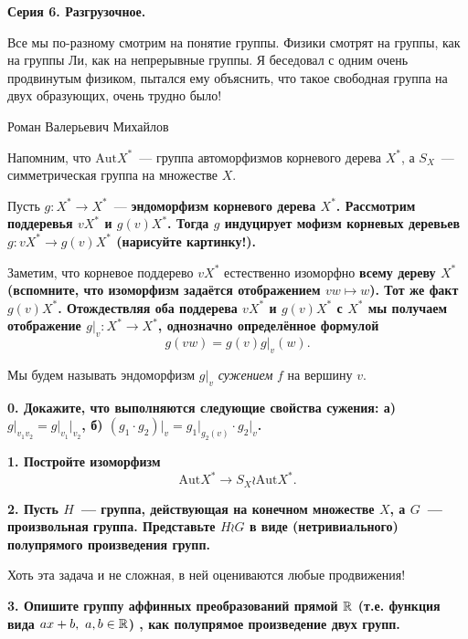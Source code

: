 \documentclass[11pt]{extarticle}
\begin{document}
	\begin{landscape}

	\pagestyle{empty}
	\begin{multicols}{2}

	\centerline{\bf{Серия 6. Разгрузочное. }}


	\epigraph{Все мы по-разному смотрим на понятие группы. Физики смотрят на группы, как на группы Ли, как на непрерывные группы. Я беседовал с одним очень продвинутым физиком, пытался ему объяснить, что такое свободная группа на двух образующих, очень трудно было!}{Роман Валерьевич Михайлов}

	Напомним, что $\mathrm{Aut}{X^*}$~--- группа автоморфизмов корневого дерева $X^*$, а $S_{X}$~---  симметрическая группа на множестве $X$.

	Пусть $g\colon X^* \to X^*$~--- \bf{эндоморфизм} корневого дерева $X^*$. Рассмотрим поддеревья $v X^*$ и $g(v) X^*$. Тогда $g$ индуцирует мофизм корневых деревьев $g\colon v X^* \to g(v) X^*$ (\bf{нарисуйте картинку!}). 

	Заметим, что корневое поддерево $v X^*$ естественно изоморфно \bf{всему} дереву $X^*$ (вспомните, что изоморфизм задаётся отображением $vw \mapsto w$). Тот же факт $g(v)X^*$. Отождествляя оба поддерева $v X^*$ и $g(v) X^*$ с $X^*$ мы получаем отображение $g\vert_{v} \colon X^* \to X^*$, однозначно определённое формулой 
	\[
		g(vw) = g(v) g\vert_{v}(w).
	\]

	Мы будем называть эндоморфизм $g\vert_{v}$ \emph{сужением} $f$ на вершину $v$.

	\bf{0.} Докажите, что выполняются следующие свойства сужения: а) $g\vert_{v_1 v_2} = g\vert_{v_1}\vert_{v_2}$, б) $(g_1 \cdot g_2)\vert_{v} = g_1\vert_{g_2(v)} \cdot g_2\vert_{v}$. 

	\bf{1.} Постройте изоморфизм 
	\[
		\mathrm{Aut}{X^*} \to S_{X} \wr \mathrm{Aut}{X^*}. 
	\]

	\bf{2.} Пусть $H$~--- группа, действующая на конечном множестве $X$, а $G$~--- произвольная группа. Представьте $H \wr G$ в виде (нетривиального) полупрямого произведения групп. 
	
	 Хоть эта задача и не сложная, в ней оцениваются любые продвижения! 

	 \bf{3.} Опишите группу аффинных преобразований прямой $\mathbb{R}$ (т.е. функция вида $ax + b, \ a, b \in \mathbb{R}$)	, как полупрямое произведение двух групп.
	


\end{multicols}
\end{landscape}
\end{document}

